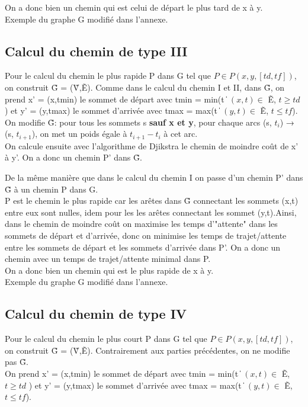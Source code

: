 \documentclass{article}
\begin{document}
On a donc bien un chemin qui est celui de départ le plus tard de x à y.\\
Exemple du graphe G modifié dans l'annexe.
\subsection*{Calcul du chemin de type III}
Pour le calcul du chemin le plus rapide P dans G tel que $ P \in P(x, y, [td, tf]) $, on construit  \~G  = (\~V,\~E). Comme dans le calcul du chemin I et II, dans \~G, on prend x' = (x,tmin) le sommet de départ avec tmin = min(t \| $ (x,t) \in $ \~E, $ t \geq td $ ) et y' = (y,tmax) le sommet d'arrivée avec tmax = max(t \| $ (y,t) \in $ \~E, $ t \leq tf $).\\
On modifie \~G: pour tous les sommets s \textbf{sauf x et y}, pour chaque arcs (s, $ t_{i} $) → (s, $ t_{i+1} $), on met un poids égale à $ t_{i+1} - t_{i} $ à cet arc.\\

On calcule ensuite avec l'algorithme de Djikstra le chemin de moindre coût de x' à y'. On a donc un chemin P' dans \~G.

De la même manière que dans le calcul du chemin I on passe d'un chemin P' dans \~G à un chemin P dans G.\\

P est le chemin le plus rapide car les arêtes dans \~G connectant les sommets (x,t) entre eux sont nulles, idem pour les les arêtes connectant les sommet (y,t).Ainsi, dans le chemin de moindre coût on maximise les temps d'"attente" dans les sommets de départ et d'arrivée, donc on minimise les temps de trajet/attente entre les sommets de départ et les sommets d'arrivée dans P'. On a donc un chemin avec un temps de trajet/attente minimal dans P. \\

On a donc bien un chemin qui est le plus rapide de x à y.\\
Exemple du graphe G modifié dans l'annexe.
\subsection*{Calcul du chemin de type IV}
Pour le calcul du chemin le plus court P dans G tel que $ P \in P(x, y, [td, tf]) $, on construit  \~G  = (\~V,\~E). Contrairement aux parties précédentes, on ne modifie pas \~G.\\
On prend x' = (x,tmin) le sommet de départ avec tmin = min(t \| $ (x,t) \in $ \~E, $ t \geq td $ ) et y' = (y,tmax) le sommet d'arrivée avec tmax = max(t \| $ (y,t) \in $ \~E, $ t \leq tf $).\\
\end{document}
